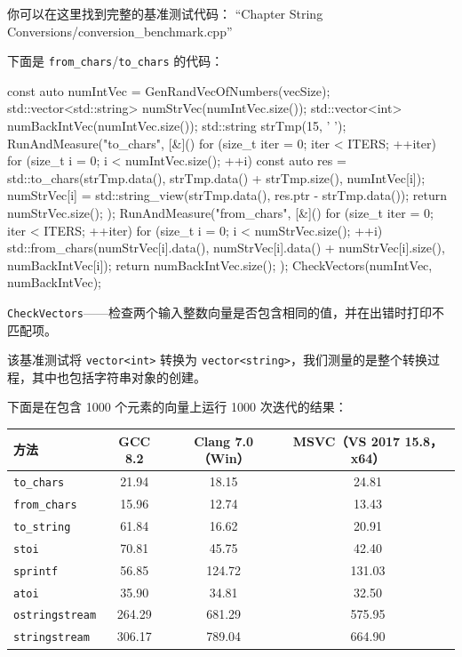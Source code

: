 你可以在这里找到完整的基准测试代码：
“Chapter String Conversions/conversion\_benchmark.cpp”

下面是 \texttt{from\_chars}/\texttt{to\_chars} 的代码：

\begin{codebox}[cpp]
const auto numIntVec = GenRandVecOfNumbers(vecSize);
std::vector<std::string> numStrVec(numIntVec.size());
std::vector<int> numBackIntVec(numIntVec.size());
std::string strTmp(15, ' ');
RunAndMeasure("to_chars", [&]() {
    for (size_t iter = 0; iter < ITERS; ++iter)
    {
        for (size_t i = 0; i < numIntVec.size(); ++i)
        {
            const auto res = std::to_chars(strTmp.data(),
                                           strTmp.data() + strTmp.size(),
                                           numIntVec[i]);
            numStrVec[i] = std::string_view(strTmp.data(),
                                           res.ptr - strTmp.data());
        }
    }
    return numStrVec.size();
});
RunAndMeasure("from_chars", [&]() {
    for (size_t iter = 0; iter < ITERS; ++iter)
    {
        for (size_t i = 0; i < numStrVec.size(); ++i)
        {
            std::from_chars(numStrVec[i].data(),
                            numStrVec[i].data() + numStrVec[i].size(),
                            numBackIntVec[i]);
        }
    }
    return numBackIntVec.size();
});
CheckVectors(numIntVec, numBackIntVec);
\end{codebox}

\texttt{CheckVectors}——检查两个输入整数向量是否包含相同的值，并在出错时打印不匹配项。

该基准测试将 \texttt{vector<int>} 转换为 \texttt{vector<string>}，我们测量的是整个转换过程，其中也包括字符串对象的创建。

下面是在包含 1000 个元素的向量上运行 1000 次迭代的结果：

\begin{table}[H]
\centering
\begin{tabularx}{\textwidth}{X c c c}
\toprule
方法 & GCC 8.2 & Clang 7.0（Win） & MSVC（VS 2017 15.8，x64） \\
\midrule
\texttt{to\_chars} & 21.94 & 18.15 & 24.81 \\
\texttt{from\_chars} & 15.96 & 12.74 & 13.43 \\
\texttt{to\_string} & 61.84 & 16.62 & 20.91 \\
\texttt{stoi} & 70.81 & 45.75 & 42.40 \\
\texttt{sprintf} & 56.85 & 124.72 & 131.03 \\
\texttt{atoi} & 35.90 & 34.81 & 32.50 \\
\texttt{ostringstream} & 264.29 & 681.29 & 575.95 \\
\texttt{stringstream} & 306.17 & 789.04 & 664.90 \\
\bottomrule
\end{tabularx}
\end{table}

